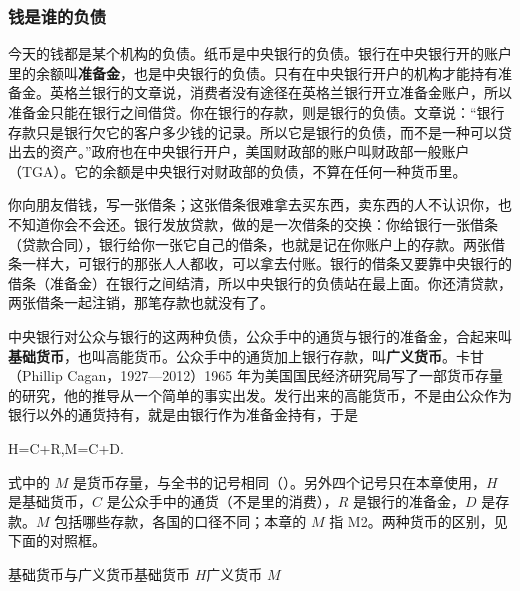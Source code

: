 \subsubsection{钱是谁的负债}
今天的钱都是某个机构的负债。纸币是中央银行的负债。银行在中央银行开的账户里的余额叫\textbf{准备金}，也是中央银行的负债。只有在中央银行开户的机构才能持有准备金。英格兰银行的文章说，消费者没有途径在英格兰银行开立准备金账户，所以准备金只能在银行之间借贷\cite{mcleay2014}。你在银行的存款，则是银行的负债。文章说：“银行存款只是银行欠它的客户多少钱的记录。所以它是银行的负债，而不是一种可以贷出去的资产。”\cite{mcleay2014}政府也在中央银行开户，美国财政部的账户叫财政部一般账户（TGA）。它的余额是中央银行对财政部的负债，不算在任何一种货币里。

\begin{intuition}[一张人人都收的借条]
你向朋友借钱，写一张借条；这张借条很难拿去买东西，卖东西的人不认识你，也不知道你会不会还。银行发放贷款，做的是一次借条的交换：你给银行一张借条（贷款合同），银行给你一张它自己的借条，也就是记在你账户上的存款。两张借条一样大，可银行的那张人人都收，可以拿去付账。银行的借条又要靠中央银行的借条（准备金）在银行之间结清，所以中央银行的负债站在最上面。你还清贷款，两张借条一起注销，那笔存款也就没有了。
\end{intuition}

中央银行对公众与银行的这两种负债，公众手中的通货与银行的准备金，合起来叫\textbf{基础货币}，也叫高能货币。公众手中的通货加上银行存款，叫\textbf{广义货币}。卡甘（Phillip Cagan，1927—2012）1965 年为美国国民经济研究局写了一部货币存量的研究，他的推导从一个简单的事实出发。发行出来的高能货币，不是由公众作为银行以外的通货持有，就是由银行作为准备金持有\cite{cagan1965}，于是
\begin{keyeq}
H=C+R,\qquad M=C+D.\label{eq:money-base}
\end{keyeq}
式中的 $M$ 是货币存量，与全书的记号相同（）。另外四个记号只在本章使用，$H$ 是基础货币，$C$ 是公众手中的通货（不是里的消费），$R$ 是银行的准备金，$D$ 是存款。$M$ 包括哪些存款，各国的口径不同；本章的 $M$ 指 M2。两种货币的区别，见下面的对照框。

\begin{compare}{基础货币与广义货币}{基础货币 $H$}{广义货币 $M$}
\end{compare}

